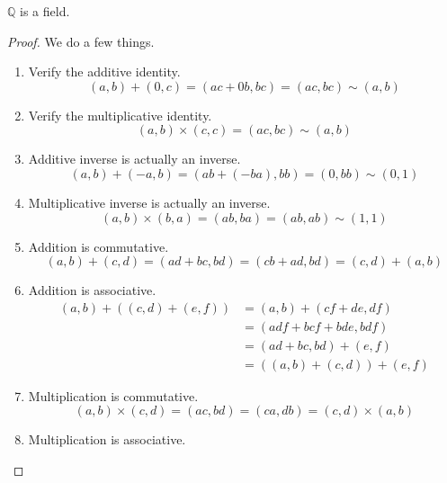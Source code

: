  \begin{theorem}
    \label{thm:rationals-are-a-field}
    $\mathbb{Q}$ is a field. 
  \end{theorem} 
  \begin{proof}
    We do a few things. 
    \begin{enumerate}
      \item Verify the additive identity. 
      \begin{equation}
        (a, b) + (0, c) = (ac + 0b, bc) = (ac, bc) \sim (a, b)
      \end{equation}
      \item Verify the multiplicative identity. 
      \begin{equation}
        (a, b) \times (c, c) = (ac, bc) \sim (a, b)
      \end{equation}
      \item Additive inverse is actually an inverse. 
      \begin{equation}
        (a, b) + (-a, b) = (ab + (-ba), bb) = (0, bb) \sim (0, 1)
      \end{equation}
      \item Multiplicative inverse is actually an inverse. 
      \begin{equation}
        (a, b) \times (b, a) = (ab, ba) = (ab, ab) \sim (1, 1)
      \end{equation}
      \item Addition is commutative. 
      \begin{equation}
        (a, b) + (c, d) = (ad + bc, bd) = (cb + ad, bd) = (c, d) + (a, b)
      \end{equation}
      \item Addition is associative. 
      \begin{align}
        (a, b) + ((c, d) + (e, f)) & = (a, b) + (cf + de, df) \\
                                   & = (adf + bcf + bde, bdf) \\
                                   & = (ad + bc, bd) + (e, f) \\
                                   & = ((a, b) + (c, d)) + (e, f)
      \end{align}
      \item Multiplication is commutative. 
      \begin{equation}
        (a, b) \times (c, d) = (ac, bd) = (ca, db) = (c, d) \times (a, b)
      \end{equation}
      \item Multiplication is associative. 

\end{enumerate}
\end{proof}
